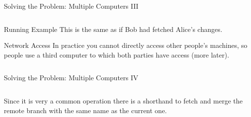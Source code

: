 \documentclass[xetex]{beamer}
\begin{document}
\begin{frame}[fragile]{Solving the Problem: Multiple Computers III}
\begin{columns}
\begin{column}{.4\linewidth}
      \begin{exampleblock}{Running Example}
        This is the same as if Bob had fetched Alice's changes.
      \end{exampleblock}

      \begin{alertblock}{Network Access}
        \footnotesize
        In practice you cannot directly access other people's machines, so
        people use a third computer to which both parties have access (more
        later).
      \end{alertblock}
    \end{column}
  \end{columns}
\end{frame}

\begin{frame}[fragile]{Solving the Problem: Multiple Computers IV}
  \begin{columns}
    \begin{column}{1.1\linewidth}
      Since it is very a common operation there is a shorthand to fetch and
      merge the remote branch with the same name as the current one.

      \begin{center}
        \noindent
\end{center}
\end{column}
\end{columns}
\end{frame}
\end{document}
